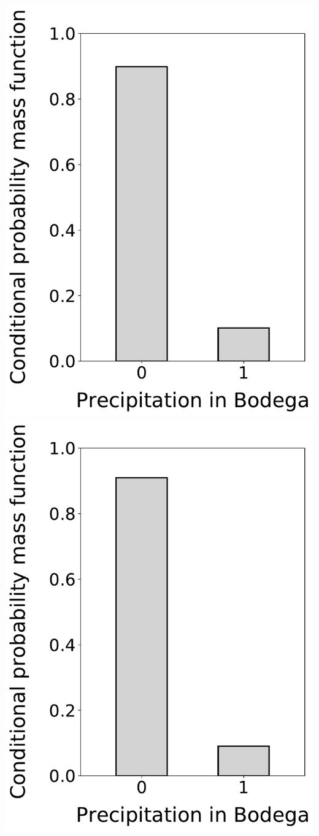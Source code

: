 \documentclass[12pt,twoside]{article}
\begin{document}
\begin{enumerate}
\includegraphics[scale=.5]{precipitation_cond_pmf_1_given_2eq0_3eq1.pdf}
\includegraphics[scale=.5]{precipitation_cond_pmf_1_given_2eq1.pdf}

\end{enumerate}
\end{document}
